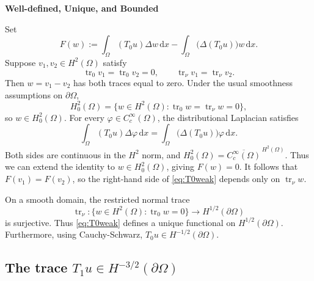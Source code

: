 \documentclass[11pt,a4paper]{article}
\newcommand{\Om}{\Omega}
\newcommand{\dd}{\,\mathrm{d}}
\newcommand{\tr}{\operatorname{tr}}
\newcommand{\dual}[2]{\left\langle #1,#2\right\rangle}
\begin{document}
\newpage


\textbf{Well-defined, Unique, and Bounded}


Set
\[
    F(w):=\int_\Om(T_0u)\Delta w\dd x
          -\int_\Om\bigl(\Delta(T_0u)\bigr)w\dd x.
\]
Suppose $v_1,v_2\in H^2(\Om)$ satisfy
\[
    \tr_0v_1=\tr_0v_2=0,
    \qquad \tr_\nu v_1=\tr_\nu v_2.
\]
Then $w=v_1-v_2$ has both traces equal to zero. Under the usual smoothness
assumptions on $\partial\Om$,
\[
    H^2_0(\Om)
       =\{w\in H^2(\Om):\tr_0w=\tr_\nu w=0\},
\]
so $w\in H^2_0(\Om)$. For every $\varphi\in C_c^\infty(\Om)$, the
distributional Laplacian satisfies
\[
    \int_\Om(T_0u)\Delta\varphi\dd x
      =\int_\Om\bigl(\Delta(T_0u)\bigr)\varphi\dd x.
\]
Both sides are continuous in the $H^2$ norm, and
$H^2_0(\Om)=\overline{C_c^\infty(\Om)}^{\,H^2(\Om)}$.
Thus we can extend the identity to $w\in H^2_0(\Om)$, giving $F(w)=0$.
It follows that $F(v_1)=F(v_2)$, so the right-hand side of
\eqref{eq:T0weak} depends only on $\tr_\nu w$. 

On a smooth domain, the restricted normal trace
\[
    \tr_\nu:\{w\in H^2(\Om):\tr_0w=0\}
                       \longrightarrow H^{1/2}(\partial\Om)
\]
is surjective. Thus \eqref{eq:T0weak} defines a unique functional on
$H^{1/2}(\partial\Om)$. Furthermore, using Cauchy-Schwarz, $T_0u \in H^{-1/2}(\partial\Om).$ 


\subsection{The trace \texorpdfstring{$T_1u\in H^{-3/2}(\partial\Om)$}{T1}}
\end{document}
